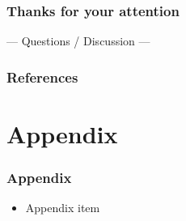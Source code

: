 

\begin{frame}[standout]
\frametitle{Thanks for your attention}
--- \quad Questions / Discussion \quad ---
\end{frame}

\begin{frame}%
\frametitle{References}
\label{references}
\end{frame}

\section*{Appendix}
\begin{frame}       %
\frametitle{Appendix}
\begin{itemize}
    \item Appendix item
\end{itemize}
\end{frame}

